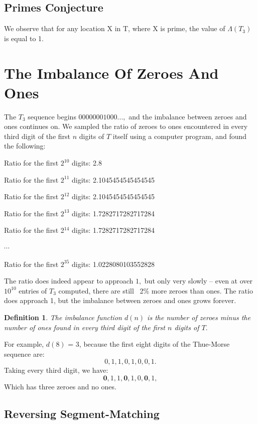 \documentclass{article}
\newtheorem{definition}{Definition}[section]
\begin{document}
\subsection{Primes Conjecture}
We observe that for any location X in T, where X is prime, the value of $\Lambda{(T_3)}$ is equal to 1.

\section{The Imbalance Of Zeroes And Ones}

The $T_3$ sequence begins $00000001000...,$ and the imbalance between zeroes and ones continues on. We sampled the ratio of zeroes to ones encountered in every third digit of the first $n$ digits of $T$ itself using a computer program, and found the following:

Ratio for the first $2^{10}$ digits: 2.8

Ratio for the first $2^{11}$ digits: 2.1045454545454545

Ratio for the first $2^{12}$ digits: 2.1045454545454545

Ratio for the first $2^{13}$ digits: 1.7282717282717284

Ratio for the first 2$^{14}$ digits: 1.7282717282717284

$\cdots$

Ratio for the first $2^{35}$ digits: 1.0228080103552828

The ratio does indeed appear to approach $1,$ but only very slowly -- even at over $10^{10}$ entries of $T_3$ computed, there are still ~2\% more zeroes than ones. The ratio does approach 1, but the imbalance between zeroes and ones grows forever.

\begin{definition}
\label{imb}
The imbalance function $d(n)$ is the number of zeroes minus the number of ones found in every third digit of the first $n$ digits of $T.$
\end{definition}

For example, $d(8)$ = 3, because the first eight digits of the Thue-Morse sequence are:
$$0, 1, 1, 0, 1, 0, 0, 1.$$
Taking every third digit, we have:
$$\textbf{0}, 1, 1, \textbf{0}, 1, 0, \textbf{0}, 1,$$
Which has three zeroes and no ones.

\subsection{Reversing Segment-Matching}
\end{document}
